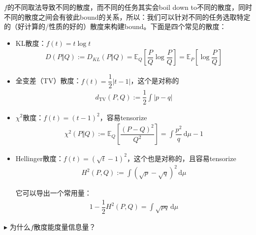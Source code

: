\documentclass[11pt,a4paper]{ctexart}
\numberwithin{equation}{section}%
\newenvironment{point}{\raggedright$\blacktriangleright$}{}
\begin{document}
$ f $的不同取法导致不同的散度，而不同的任务其实会boil down to不同的散度，同时不同的散度之间会有彼此bound的关系，所以：我们可以针对不同的任务选取特定的（好计算的/性质的好的）散度来构建bound。下面是四个常见的散度：
\begin{itemize}[topsep=2pt,itemsep=0pt]
    \item KL散度：$ f(t)=t\log t $
    \begin{align*}
        D(P\Vert Q):=D_{KL}(P\Vert Q)= \mathbb{E}_Q\left[ \dfrac{ P }{ Q } \log \dfrac{ P  }{ Q }  \right] = \mathbb{E}_P\left[ \log \dfrac{ P  }{ Q }  \right]
    \end{align*}
    \item 全变差（TV）散度：$ f(t)=\dfrac{ 1 }{ 2 } \left\vert t-1 \right\vert  $，这个是对称的
    \begin{align*}
         d_\mathrm{ TV }(P,Q):= \dfrac{ 1 }{ 2 } \int \left\vert p-q \right\vert
    \end{align*}
    \item $ \chi^2 $散度：$ f(t)=(t-1)^2 $，容易tensorize
    \begin{align*}
        \chi^2(P\Vert Q) := \mathbb{E}_Q\left[ \dfrac{ (P-Q)^2 }{ Q^2 }  \right] = \int \dfrac{ p^2 }{ q } \,\mathrm{d}\mu -1 
    \end{align*}
    \item Hellinger散度：$ f(t)=(\sqrt{t}-1)^2 $，这个也是对称的，且容易tensorize
    \begin{align*}
        H^2(P,Q):=  \int (\sqrt{p}-\sqrt{q})^2 \,\mathrm{d}\mu 
    \end{align*}

    它可以导出一个常用量：
    \begin{align*}
        1-\dfrac{ 1 }{ 2 } H^2(P,Q) = \int \sqrt{pq} \,\mathrm{d}\mu
    \end{align*}
    
    
\end{itemize}

    
\begin{point}
    为什么$ f $散度能度量信息量？
\end{point}
\end{document}
